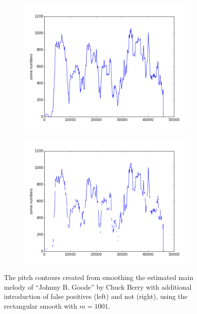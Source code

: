 \begin{figure}[b]
        \centering
        \begin{subfigure}[b]{0.48\textwidth}
                \includegraphics[width=\textwidth]{Figures/smoothing_1001_false}
                \vspace{20pt}
        \end{subfigure}
        \begin{subfigure}[b]{0.48\textwidth}
                \includegraphics[width=\textwidth]{Figures/smoothing_1001_true}
                \vspace{20pt}
        \end{subfigure}
    \caption{The pitch contours created from smoothing the estimated main melody of ``Johnny B. Goode'' by Chuck Berry with additional introduction of false positives (left) and not (right), using the rectangular smooth with $m = 1001$.}
	\label{fig:excludezeros}
\end{figure}

